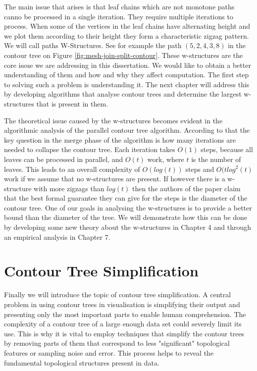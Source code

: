 The main issue that arises is that leaf chains which are not monotone paths canno be processed in a single iteration. They require multiple iterations to process. When some of the vertices in the leaf chains have alternating height and we plot them according to their height they form a characteristic zigzag pattern. We will call paths W-Structures. See for example the path $(5, 2, 4, 3, 8)$ in the contour tree on Figure \ref{fig:mesh-join-split-contour}. These w-structures are the core issue we are addressing in this dissertation. We would like to obtain a better understanding of them and how and why they affect computation. The first step to solving such a problem is understanding it. The next chapter will address this by developing algorithms that analyse contour trees and determine the largest w-structures that is present in them.


The theoretical issue caused by the w-structures becomes evident in the algorithmic analysis of the parallel contour tree algorithm. According to that the key question in the merge phase of the algorithm is how many iterations are needed to collapse the contour tree. Each iteration takes $O(1)$ steps, because all leaves can be processed in parallel, and $O(t)$ work, where $t$ is the number of leaves. This leads to an overall complexity of $O(log(t))$ steps and $O(tlog^2(t)$ work if we assume that no w-structures are present. If however there is a w-structure with more zigzags than $log(t)$ then the authors of the paper claim that the best formal guarantee they can give for the steps is the diameter of the contour tree. One of our goals in analysing the w-structures is to provide a better bound than the diameter of the tree. We will demonstrate how this can be done by developing some new theory about the w-structures in Chapter 4 and through an empirical analysis in Chapter 7.


\section{Contour Tree Simplification}

Finally we will introduce the topic of contour tree simplification. A central problem in using contour trees in visualisation is simplifying their output and presenting only the most important parts to enable human comprehension. The complexity of a contour tree of a large enough data set could severely limit its use. This is why it is vital to employ techniques that simplify the contour trees by removing parts of them that correspond to less "significant" topological features or sampling noise and error. This process helps to reveal the fundamental topological structures present in data.


